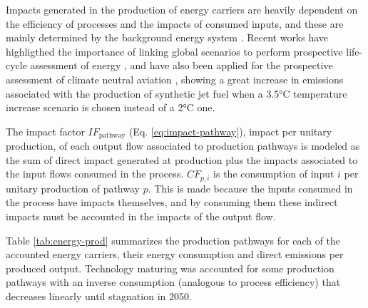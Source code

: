 \documentclass[
]{kaohandt}
\begin{document}

Impacts generated in the production of energy carriers are heavily dependent on the efficiency of processes and the impacts of consumed inputs, and these are mainly determined by the background energy system . Recent works have highligthed the importance of linking global scenarios to perform prospective life-cycle assessment of energy , and have also been applied for the prospective assessment of climate neutral aviation , showing a great increase in emissions associated with the production of synthetic jet fuel when a 3.5°C temperature increase scenario is chosen instead of a 2°C one.

The impact factor $IF_{\text{pathway}}$ (Eq. \ref{eq:impact-pathway}), impact per unitary production, of each output flow associated to production pathways is modeled as the sum of direct impact generated at production plus the impacts associated to the input flows consumed in the process. $CF_{p, i}$ is the consumption of input $i$ per unitary production of pathway $p$. This is made because the inputs consumed in the process have impacts themselves, and by consuming them these indirect impacts must be accounted in the impacts of the output flow.

Table \ref{tab:energy-prod} summarizes the production pathways for each of the accounted energy carriers, their energy consumption and direct emissions per produced output. Technology maturing was accounted for some production pathways with an inverse consumption (analogous to process efficiency) that decreases linearly until stagnation in 2050.
\end{document}
